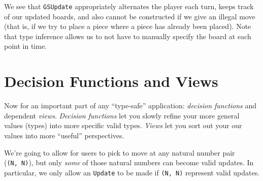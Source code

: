 \documentclass[]{article}
\newenvironment{Shaded}{}{}
\newcommand{\DataTypeTok}[1]{\textcolor[rgb]{0.56,0.13,0.00}{#1}}
\newcommand{\FunctionTok}[1]{\textcolor[rgb]{0.02,0.16,0.49}{#1}}
\newcommand{\KeywordTok}[1]{\textcolor[rgb]{0.00,0.44,0.13}{\textbf{#1}}}
\newcommand{\NormalTok}[1]{#1}
\begin{document}
\begin{Shaded}
\end{Shaded}

We see that \texttt{GSUpdate} appropriately alternates the player each turn,
keeps track of our updated boards, and also cannot be constructed if we give an
illegal move (that is, if we try to place a piece where a piece has already been
placed). Note that type inference allows us to not have to manually specify the
board at each point in time.

\hypertarget{decision-functions-and-views}{%
\section{Decision Functions and Views}\label{decision-functions-and-views}}

Now for an important part of any ``type-safe'' application: \emph{decision
functions} and dependent \emph{views}. \emph{Decision functions} let you slowly
refine your more general values (types) into more specific valid types.
\emph{Views} let you sort out your our values into more ``useful'' perspectives.

We're going to allow for users to pick to move at any natural number pair
(\texttt{(N,\ N)}), but only \emph{some} of those natural numbers can become
valid updates. In particular, we only allow an \texttt{Update} to be made if
\texttt{(N,\ N)} represent valid updates.
\end{document}
